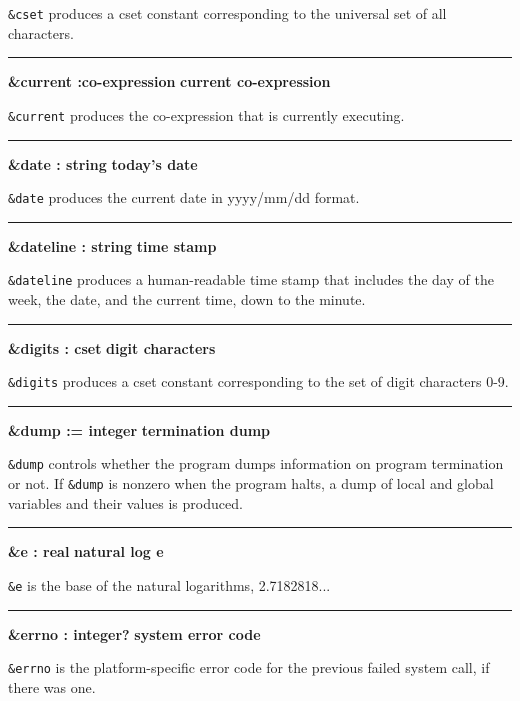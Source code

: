 \noindent
{}\texttt{\&cset} produces a cset constant
corresponding to the universal set of all characters.

\bigskip\hrule\vspace{0.1cm}
\noindent
{\bf \&current :co{}-expression } \hfill {\bf current co{}-expression}

\noindent
{}\texttt{\&current} produces the
co-expression that is currently executing.

\bigskip\hrule\vspace{0.1cm}
\noindent
{\bf \&date : string } \hfill {\bf today's date}

\noindent
{}\texttt{\&date} produces the current
date in yyyy/mm/dd format.

\bigskip\hrule\vspace{0.1cm}
\noindent
{\bf \&dateline : string } \hfill {\bf time stamp}

\noindent
{}\texttt{\&dateline} produces a human-readable time
stamp that includes the day of the week, the date, and the current
time, down to the minute.

\bigskip\hrule\vspace{0.1cm}
\noindent
{\bf \&digits : cset } \hfill {\bf digit characters}

\noindent
{}\texttt{\&digits} produces a cset constant
corresponding to the set of digit characters 0-9.

\bigskip\hrule\vspace{0.1cm}
\noindent
{\bf \&dump := integer } \hfill {\bf termination dump}

\noindent
\texttt{\&dump} controls whether the program dumps information on
program termination or not. If \texttt{\&dump} is nonzero when the
program halts, a dump of local and global variables and their values is
produced.

\bigskip\hrule\vspace{0.1cm}
\noindent
{\bf \&e : real } \hfill {\bf natural log e}

\noindent
{}\texttt{\&e} is the base of the natural
logarithms, 2.7182818...

\bigskip\hrule\vspace{0.1cm}
\noindent
{\bf \&errno : integer? } \hfill {\bf system error code}

\noindent
\texttt{\&errno} is the platform-specific error code for the previous
failed system call, if there was one.

